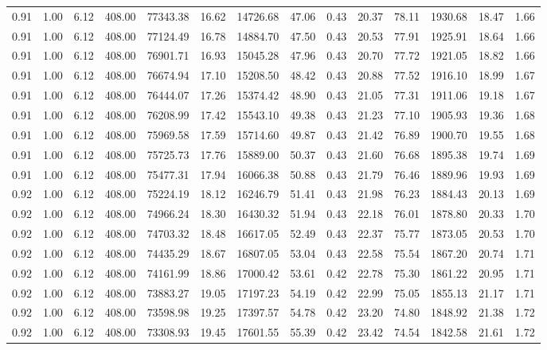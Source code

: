 \begin{table}[!ht]
\begin{tabular}{rrrrrrrrrrrrrr}
0.91 & 1.00 & 6.12 & 408.00 & 77343.38 & 16.62 & 14726.68 & 47.06 & 0.43 & 20.37 & 78.11 & 1930.68 & 18.47 & 1.66 \\
0.91 & 1.00 & 6.12 & 408.00 & 77124.49 & 16.78 & 14884.70 & 47.50 & 0.43 & 20.53 & 77.91 & 1925.91 & 18.64 & 1.66 \\
0.91 & 1.00 & 6.12 & 408.00 & 76901.71 & 16.93 & 15045.28 & 47.96 & 0.43 & 20.70 & 77.72 & 1921.05 & 18.82 & 1.66 \\
0.91 & 1.00 & 6.12 & 408.00 & 76674.94 & 17.10 & 15208.50 & 48.42 & 0.43 & 20.88 & 77.52 & 1916.10 & 18.99 & 1.67 \\
0.91 & 1.00 & 6.12 & 408.00 & 76444.07 & 17.26 & 15374.42 & 48.90 & 0.43 & 21.05 & 77.31 & 1911.06 & 19.18 & 1.67 \\
0.91 & 1.00 & 6.12 & 408.00 & 76208.99 & 17.42 & 15543.10 & 49.38 & 0.43 & 21.23 & 77.10 & 1905.93 & 19.36 & 1.68 \\
0.91 & 1.00 & 6.12 & 408.00 & 75969.58 & 17.59 & 15714.60 & 49.87 & 0.43 & 21.42 & 76.89 & 1900.70 & 19.55 & 1.68 \\
0.91 & 1.00 & 6.12 & 408.00 & 75725.73 & 17.76 & 15889.00 & 50.37 & 0.43 & 21.60 & 76.68 & 1895.38 & 19.74 & 1.69 \\
0.91 & 1.00 & 6.12 & 408.00 & 75477.31 & 17.94 & 16066.38 & 50.88 & 0.43 & 21.79 & 76.46 & 1889.96 & 19.93 & 1.69 \\
0.92 & 1.00 & 6.12 & 408.00 & 75224.19 & 18.12 & 16246.79 & 51.41 & 0.43 & 21.98 & 76.23 & 1884.43 & 20.13 & 1.69 \\
0.92 & 1.00 & 6.12 & 408.00 & 74966.24 & 18.30 & 16430.32 & 51.94 & 0.43 & 22.18 & 76.01 & 1878.80 & 20.33 & 1.70 \\
0.92 & 1.00 & 6.12 & 408.00 & 74703.32 & 18.48 & 16617.05 & 52.49 & 0.43 & 22.37 & 75.77 & 1873.05 & 20.53 & 1.70 \\
0.92 & 1.00 & 6.12 & 408.00 & 74435.29 & 18.67 & 16807.05 & 53.04 & 0.43 & 22.58 & 75.54 & 1867.20 & 20.74 & 1.71 \\
0.92 & 1.00 & 6.12 & 408.00 & 74161.99 & 18.86 & 17000.42 & 53.61 & 0.42 & 22.78 & 75.30 & 1861.22 & 20.95 & 1.71 \\
0.92 & 1.00 & 6.12 & 408.00 & 73883.27 & 19.05 & 17197.23 & 54.19 & 0.42 & 22.99 & 75.05 & 1855.13 & 21.17 & 1.71 \\
0.92 & 1.00 & 6.12 & 408.00 & 73598.98 & 19.25 & 17397.57 & 54.78 & 0.42 & 23.20 & 74.80 & 1848.92 & 21.38 & 1.72 \\
0.92 & 1.00 & 6.12 & 408.00 & 73308.93 & 19.45 & 17601.55 & 55.39 & 0.42 & 23.42 & 74.54 & 1842.58 & 21.61 & 1.72 \\

\end{tabular}
\end{table}
